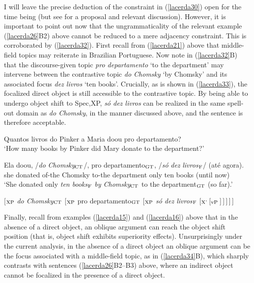 \documentclass[output=paper]{langscibook}
\begin{document}
I will leave the precise deduction of the constraint in (\ref{lacerda30}) open for the time being (but see \citealt{Lacerda2020b} for a proposal and relevant discussion). However, it is important to point out now that the ungrammaticality of the relevant example (\ref{lacerda26}B2) above cannot be reduced to a mere adjacency constraint. This is corroborated by (\ref{lacerda32}). First recall from (\ref{lacerda21}) above that middle-field topics may reiterate in Brazilian Portuguese. Now note in (\ref{lacerda32}B) that the discourse-given topic \emph{pro departamento} ‘to the department’ may intervene between the contrastive topic \emph{do Chomsky} ‘by Chomsky’ and its associated focus \emph{dez livros} ‘ten books’. Crucially, as is shown in (\ref{lacerda33}), the focalized direct object is still accessible to the contrastive topic. By being able to undergo object shift to Spec,XP, \emph{só dez livros} can be realized in the same spell-out domain as \emph{do Chomsky}, in the manner discussed above, and the sentence is therefore acceptable.

\begin{exe}
\ex \label{lacerda32}
\begin{xlist}
 \label{lacerda32A}
Quantos livros do Pinker a Maria doou pro departamento?\\
‘How many books by Pinker did Mary donate to the department?’

 \label{lacerda32B}
\gll {}Ela 	doou, 	/\emph{do} 	\emph{Chomsky}$_{\textnormal{CT}}$/, 	pro 	departamento$_{\textnormal{GT}}$,	/\emph{só}	\emph{dez} 	\emph{livros}$_{\textnormal{F}}$/ 	(até 	agora).\\
she 	donated	of-the	Chomsky	to-the 	department	only 	ten 	books	(until	now)\\
\glt‘She donated only \emph{ten books}$_{\textnormal{F}}$ \emph{by Chomsky}$_{\textnormal{CT}}$ to the department$_{\textnormal{GT}}$ (so far).’
\end{xlist}

\ex \label{lacerda33}
[$_{\textnormal{XP}}$ \emph{do Chomsky$_{\textnormal{CT}}$} [$_{\textnormal{XP}}$ pro departamento$_{\textnormal{GT}}$ [$_{\textnormal{XP}}$ \emph{só dez livros$_{\textnormal{F}}$} [$_{\textnormal{X'}}$\,[$_{\textnormal{vP}}$\,]\,]\,]\,]\,]
\end{exe}

Finally, recall from examples (\ref{lacerda15}) and (\ref{lacerda16}) above that in the absence of a direct object, an oblique argument can reach the object shift position (that is, object shift exhibits superiority effects). Unsurprisingly under the current analysis, in the absence of a direct object an oblique argument can be the focus associated with a middle-field topic, as in (\ref{lacerda34}B), which sharply contrasts with sentences (\ref{lacerda26}B2--B3) above, where an indirect object cannot be focalized in the presence of a direct object.
\end{document}

